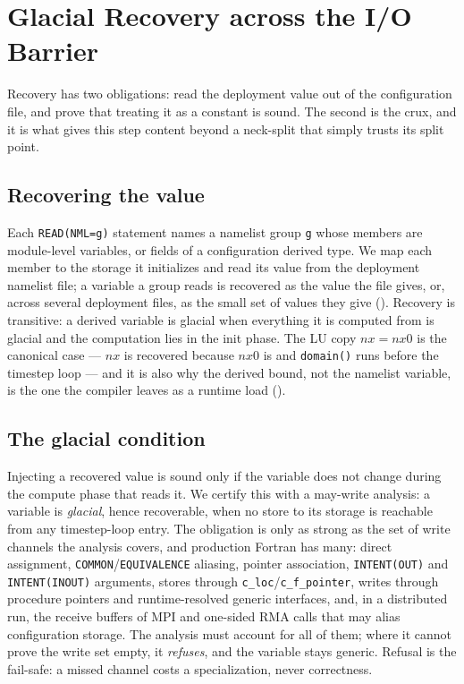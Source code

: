 \section{Glacial Recovery across the I/O Barrier}
\label{sec:recovery}

Recovery has two obligations: read the deployment value out of the configuration file, and prove that treating it as a constant is sound. The second is the crux, and it is what gives this step content beyond a neck-split that simply trusts its split point.

\subsection{Recovering the value}
Each \lstinline[style=fortran]|READ(NML=g)| statement names a namelist group \texttt{g} whose members are module-level variables, or fields of a configuration derived type. We map each member to the storage it initializes and read its value from the deployment namelist file; a variable a group reads is recovered as the value the file gives, or, across several deployment files, as the small set of values they give (). Recovery is transitive: a derived variable is glacial when everything it is computed from is glacial and the computation lies in the init phase. The LU copy $\mathit{nx}=\mathit{nx0}$ is the canonical case --- $\mathit{nx}$ is recovered because $\mathit{nx0}$ is and \lstinline[style=fortran]|domain()| runs before the timestep loop --- and it is also why the derived bound, not the namelist variable, is the one the compiler leaves as a runtime load ().

\subsection{The glacial condition}
Injecting a recovered value is sound only if the variable does not change during the compute phase that reads it. We certify this with a may-write analysis: a variable is \emph{glacial}, hence recoverable, when no store to its storage is reachable from any timestep-loop entry. The obligation is only as strong as the set of write channels the analysis covers, and production Fortran has many: direct assignment, \texttt{COMMON}/\texttt{EQUIVALENCE} aliasing, pointer association, \texttt{INTENT(OUT)} and \texttt{INTENT(INOUT)} arguments, stores through \texttt{c\_loc}/\texttt{c\_f\_pointer}, writes through procedure pointers and runtime-resolved generic interfaces, and, in a distributed run, the receive buffers of MPI and one-sided RMA calls that may alias configuration storage. The analysis must account for all of them; where it cannot prove the write set empty, it \emph{refuses}, and the variable stays generic. Refusal is the fail-safe: a missed channel costs a specialization, never correctness.

